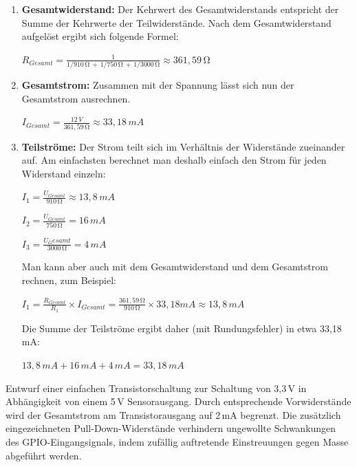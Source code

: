 \begin{enumerate}
    \item \textbf{Gesamtwiderstand:} Der Kehrwert des Gesamtwiderstands entspricht
    der Summe der Kehrwerte der Teilwiderstände. Nach dem Gesamtwiderstand aufgelöst
    ergibt sich folgende Formel:

    $R_{Gesamt} = \frac{1}{1/910\,\si{\ohm} \,+\, 1/750\,\si{\ohm} \,+\, 1/3000\,\si{\ohm}} \approx 361,59\,\si{\ohm}$

    \item \textbf{Gesamtstrom:} Zusammen mit der Spannung lässt sich nun der Gesamtstrom
    ausrechnen.

    $I_{Gesamt} = \frac{12\,V}{361,59\,\si{\ohm}} \approx 33,18\,mA$

    \item \textbf{Teilströme:} Der Strom teilt sich im Verhältnis der Widerstände
    zueinander auf. Am einfachsten berechnet man deshalb einfach den Strom für
    jeden Widerstand einzeln:

    $I_1 = \frac{U_{Gesamt}}{910\,\si{\ohm}} \approx 13,8\,mA$

    $I_2 = \frac{U_{Gesamt}}{750\,\si{\ohm}} = 16\,mA$

    $I_3 = \frac{{U_Gesamt}}{3000\,\si{\ohm}} = 4\,mA$

    Man kann aber auch mit dem Gesamtwiderstand und dem Gesamtstrom rechnen, zum Beispiel:

    $I_1 = \frac{R_{Gesamt}}{R_1} \times I_{Gesamt} = \frac{361,59\,\si{\ohm}}{910\,\si{\ohm}} \times 33,18 mA \approx 13,8\,mA$

    Die Summe der Teilströme ergibt daher (mit Rundungsfehler) in etwa 33,18\,mA:

    $13,8\,mA + 16\,mA + 4\,mA = 33,18\,mA$
\end{enumerate}

\teilaufgabe
Entwurf einer einfachen Transistorschaltung zur Schaltung von 3,3\,V in
Abhängigkeit von einem 5\,V Sensorausgang. Durch entsprechende Vorwiderstände
wird der Gesamtstrom am Transistorausgang auf 2\,mA begrenzt. Die zusätzlich
eingezeichneten Pull-Down-Widerstände verhindern ungewollte Schwankungen des
GPIO-Eingangsignals, indem zufällig auftretende Einstreuungen gegen Masse
abgeführt werden.

